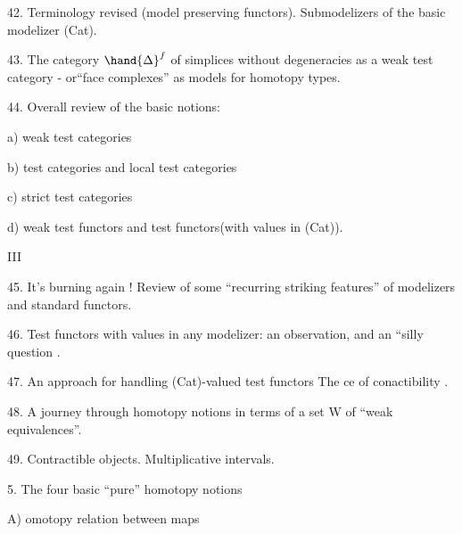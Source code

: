 42.  Terminology revised (model preserving functors).  Submodelizers of
the basic modelizer (Cat).

43.  The category $\hand{\Delta}^{f}$ of simplices without degeneracies as a weak test
category  -  or``face complexes'' as models for homotopy types.

44.  Overall review of the basic notions:

a)  weak test categories

b)  test categories and local test categories

c) strict test categories

d) weak test functors and test functors(with values in (Cat)).

   \hand{)}
III \hand{(}

45.  It's burning again ! Review of some ``recurring striking features''
of modelizers\hand{,} and  standard   functors.

\hand{(}46.\hand{)} Test functors with values in any modelizer: an observation, and an 
``silly question .

47.  An approach for handling (Cat)-valued test functors\hand{,}  The %
ce of conactibility .

48. \deleted{(}A journey through  homotopy notions\hand{,} \deleted{(}in terms of a set W of ``weak
equivalences''\deleted{)}.

49.  Contractible objects.  Multiplicative intervals.

\hand{(}5.\hand{)} The four basic ``pure'' homotopy notions   

A) omotopy relation between maps

